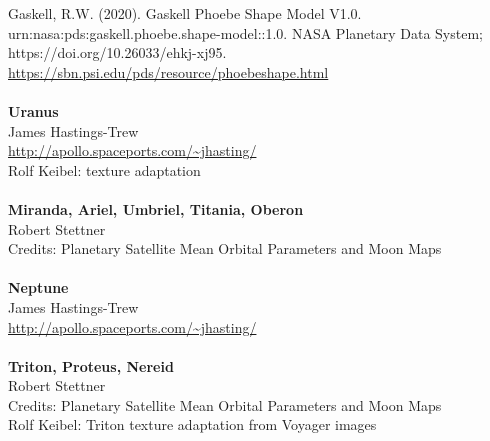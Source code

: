 \documentclass[Orbiter User Manual.tex]{subfiles}
\begin{document}
Gaskell, R.W. (2020). Gaskell Phoebe Shape Model V1.0. urn:nasa:pds:gaskell.phoebe.shape-model::1.0. NASA Planetary Data System; https://doi.org/10.26033/ehkj-xj95.
\url{https://sbn.psi.edu/pds/resource/phoebeshape.html}\\
\\
\textbf{Uranus}\\
James Hastings-Trew\\
\url{http://apollo.spaceports.com/~jhasting/}\\
Rolf Keibel: texture adaptation\\
\\
\textbf{Miranda, Ariel, Umbriel, Titania, Oberon}\\
Robert Stettner\\
Credits: Planetary Satellite Mean Orbital Parameters and Moon Maps\\
\\
\textbf{Neptune}\\
James Hastings-Trew\\
\url{http://apollo.spaceports.com/~jhasting/}\\
\\
\textbf{Triton, Proteus, Nereid}\\
Robert Stettner\\
Credits: Planetary Satellite Mean Orbital Parameters and Moon Maps\\
Rolf Keibel: Triton texture adaptation from Voyager images
\end{document}
